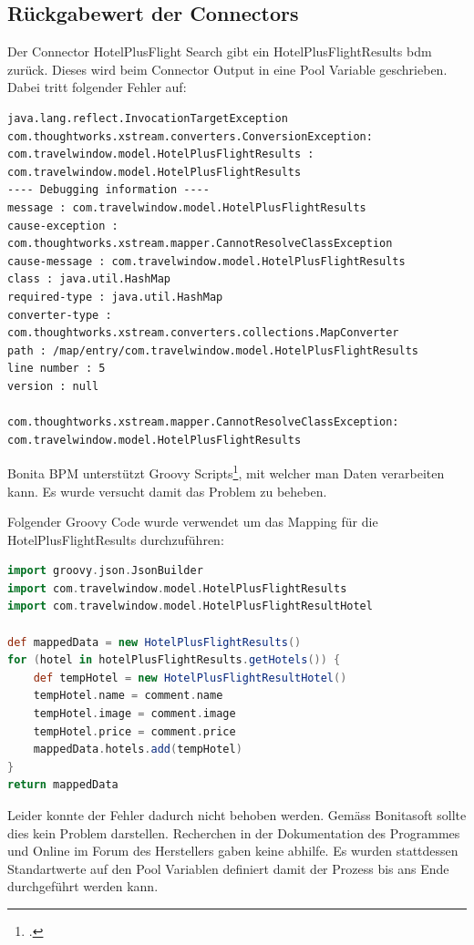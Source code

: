 \subsection{Rückgabewert der Connectors}
Der Connector HotelPlusFlight Search gibt ein HotelPlusFlightResults \gls{bdm} zurück. Dieses wird beim Connector Output in eine Pool Variable geschrieben. Dabei tritt folgender Fehler auf:
\begin{lstlisting}
java.lang.reflect.InvocationTargetException
com.thoughtworks.xstream.converters.ConversionException: com.travelwindow.model.HotelPlusFlightResults : com.travelwindow.model.HotelPlusFlightResults
---- Debugging information ----
message : com.travelwindow.model.HotelPlusFlightResults
cause-exception : com.thoughtworks.xstream.mapper.CannotResolveClassException
cause-message : com.travelwindow.model.HotelPlusFlightResults
class : java.util.HashMap
required-type : java.util.HashMap
converter-type : com.thoughtworks.xstream.converters.collections.MapConverter
path : /map/entry/com.travelwindow.model.HotelPlusFlightResults
line number : 5
version : null

com.thoughtworks.xstream.mapper.CannotResolveClassException: com.travelwindow.model.HotelPlusFlightResults
\end{lstlisting}
Bonita BPM unterstützt Groovy Scripts\footcite{Groovy_2016-06-25}, mit welcher man Daten verarbeiten kann. Es wurde versucht damit das Problem zu beheben.

Folgender Groovy Code wurde verwendet um das Mapping für die HotelPlusFlightResults durchzuführen:
\begin{lstlisting}[language=Groovy,firstnumber=1]
import groovy.json.JsonBuilder
import com.travelwindow.model.HotelPlusFlightResults
import com.travelwindow.model.HotelPlusFlightResultHotel

def mappedData = new HotelPlusFlightResults()
for (hotel in hotelPlusFlightResults.getHotels()) {
	def tempHotel = new HotelPlusFlightResultHotel()
	tempHotel.name = comment.name
	tempHotel.image = comment.image
	tempHotel.price = comment.price
	mappedData.hotels.add(tempHotel)
}
return mappedData
\end{lstlisting}
Leider konnte der Fehler dadurch nicht behoben werden. Gemäss Bonitasoft sollte dies kein Problem darstellen. Recherchen in der Dokumentation des Programmes und Online im Forum des Herstellers gaben keine abhilfe. Es wurden stattdessen Standartwerte auf den Pool Variablen definiert damit der Prozess bis ans Ende durchgeführt werden kann.

